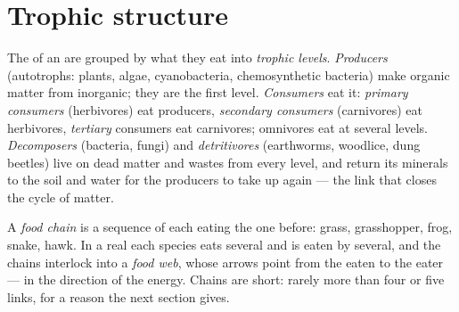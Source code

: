 \section{Trophic structure}

\begin{definition}\label{def:b1:ecosystem-organization:trophic}
The  of an  are grouped by what they eat into
\emph{trophic levels}. \emph{Producers} (autotrophs: plants, algae,
cyanobacteria, chemosynthetic bacteria) make organic matter from
inorganic; they are the first level. \emph{Consumers} eat it:
\emph{primary consumers} (herbivores) eat producers, \emph{secondary
consumers} (carnivores) eat herbivores, \emph{tertiary} consumers eat
carnivores; omnivores eat at several levels. \emph{Decomposers}
(bacteria, fungi) and \emph{detritivores} (earthworms, woodlice,
dung beetles) live on dead matter and wastes from every level, and
return its minerals to the soil and water for the producers to take
up again --- the link that closes the cycle of matter.
\end{definition}

\begin{definition}\label{def:b1:ecosystem-organization:foodweb}
A \emph{food chain} is a sequence of  each eating the one
before: grass, grasshopper, frog, snake, hawk. In a real 
each species eats several and is eaten by several, and the chains
interlock into a \emph{food web}, whose arrows point from the eaten
to the eater --- in the direction of the energy. Chains are short:
rarely more than four or five links, for a reason the next section
gives.
\end{definition}

